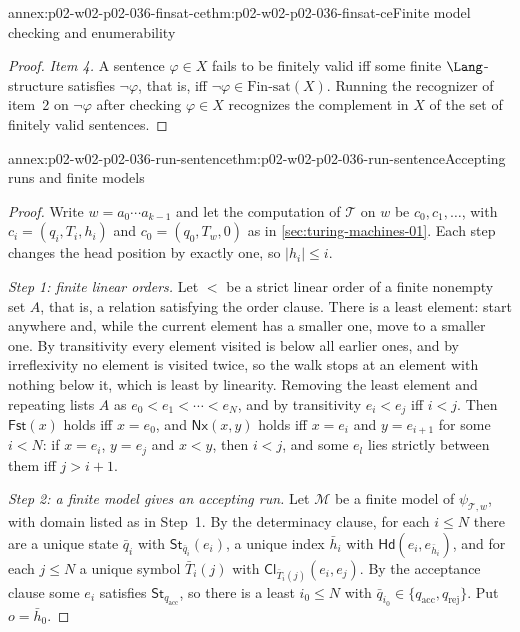 \begin{annexitem}{annex:p02-w02-p02-036-finsat-ce}{thm:p02-w02-p02-036-finsat-ce}{Finite model checking and enumerability}
\begin{proof}
\emph{Item 4.}  A sentence \(\varphi\in X\) fails to be finitely valid iff some
finite \(\Lang\)-structure satisfies \(\neg\varphi\), that is, iff
\(\neg\varphi\in\mathrm{Fin\text{-}sat}(X)\).  Running the recognizer of
item~2 on \(\neg\varphi\) after checking \(\varphi\in X\) recognizes the
complement in \(X\) of the set of finitely valid sentences.
\end{proof}
\end{annexitem}

\begin{annexitem}{annex:p02-w02-p02-036-run-sentence}{thm:p02-w02-p02-036-run-sentence}{Accepting runs and finite models}
\begin{proof}
Write \(w=a_0\cdots a_{k-1}\) and let the computation of \(\mathcal T\) on
\(w\) be \(c_0,c_1,\ldots\), with \(c_i=(q_i,T_i,h_i)\) and
\(c_0=(q_0,T_w,0)\) as in \cref{sec:turing-machines-01}.  Each step changes
the head position by exactly one, so \(\lvert h_i\rvert\leq i\).

\emph{Step 1: finite linear orders.}  Let \(<\) be a strict linear order of a
finite nonempty set \(A\), that is, a relation satisfying the order clause.
There is a least element: start anywhere and, while the current element has
a smaller one, move to a smaller one.  By transitivity every element visited
is below all earlier ones, and by irreflexivity no element is visited twice,
so the walk stops at an element with nothing below it, which is least by
linearity.  Removing the least element and repeating lists \(A\) as
\(e_0<e_1<\cdots<e_N\), and by transitivity \(e_i<e_j\) iff \(i<j\).  Then
\(\mathsf{Fst}(x)\) holds iff \(x=e_0\), and \(\mathsf{Nx}(x,y)\) holds iff
\(x=e_i\) and \(y=e_{i+1}\) for some \(i<N\): if \(x=e_i\), \(y=e_j\) and \(x<y\),
then \(i<j\), and some \(e_l\) lies strictly between them iff \(j>i+1\).

\emph{Step 2: a finite model gives an accepting run.}  Let \(\mathcal M\) be a
finite model of \(\psi_{\mathcal T,w}\), with domain listed as in Step~1.  By
the determinacy clause, for each \(i\leq N\) there are a unique state
\(\bar q_i\) with \(\mathsf{St}_{\bar q_i}(e_i)\), a unique index \(\bar h_i\) with
\(\mathsf{Hd}(e_i,e_{\bar h_i})\), and for each \(j\leq N\) a unique symbol
\(\bar T_i(j)\) with \(\mathsf{Cl}_{\bar T_i(j)}(e_i,e_j)\).  By the
acceptance clause some \(e_i\) satisfies \(\mathsf{St}_{q_{\mathrm{acc}}}\), so
there is a least \(i_0\leq N\) with
\(\bar q_{i_0}\in\{q_{\mathrm{acc}},q_{\mathrm{rej}}\}\).  Put \(o=\bar h_0\).


\end{proof}
\end{annexitem}
